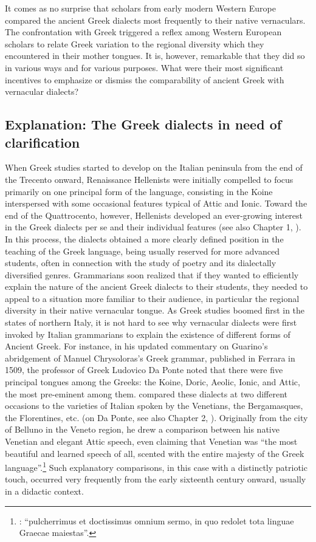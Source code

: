 It comes as no surprise that scholars from early modern Western Europe compared the ancient Greek dialects most frequently to their native vernaculars. The confrontation with Greek triggered a reflex among Western European scholars to relate Greek variation to the regional diversity which they encountered in their mother tongues. It is, however, remarkable that they did so in various ways and for various purposes. What were their most significant incentives to emphasize or dismiss the comparability of ancient Greek with vernacular dialects?

\subsection{Explanation: The Greek dialects in need of clarification}\label{sec:8.1.1}


When Greek studies started to develop on the Italian peninsula from the end of the Trecento onward, Renaissance Hellenists were initially compelled to focus primarily on one principal form of the language, consisting in the Koine interspersed with some occasional features typical of Attic and Ionic. Toward the end of the Quattrocento, however, Hellenists developed an ever-growing interest in the Greek dialects per se and their individual features (see also Chapter 1, ). In this process, the dialects obtained a more clearly defined position in the teaching of the Greek language, being usually reserved for more advanced students, often in connection with the study of poetry and its dialectally diversified genres. Grammarians soon realized that if they wanted to efficiently explain the nature of the ancient Greek dialects to their students, they needed to appeal to a situation more familiar to their audience, in particular the regional diversity in their native vernacular tongue. As Greek studies boomed first in the states of northern Italy, it is not hard to see why vernacular dialects were first invoked by Italian grammarians to explain the existence of different forms of Ancient Greek. For instance, in his updated commentary on Guarino’s abridgement of Manuel Chrysoloras’s Greek grammar, published in Ferrara in 1509, the professor of Greek Ludovico Da Ponte noted that there were five principal tongues among the Greeks: the Koine, Doric, Aeolic, Ionic, and Attic, the most pre-eminent among them.  compared these dialects at two different occasions to the varieties of Italian spoken by the Venetians, the Bergamasques, the Florentines, etc. (on Da Ponte, see also Chapter 2, ). Originally from the city of Belluno in the Veneto region, he drew a comparison between his native Venetian and elegant Attic speech, even claiming that Venetian was “the most beautiful and learned speech of all, scented with the entire majesty of the Greek language”.\footnote{: “pulcherrimus et doctissimus omnium sermo, in quo redolet tota linguae Graecae maiestas”.} Such explanatory comparisons, in this case with a distinctly patriotic touch, occurred very frequently from the early sixteenth century onward, usually in a didactic context.

